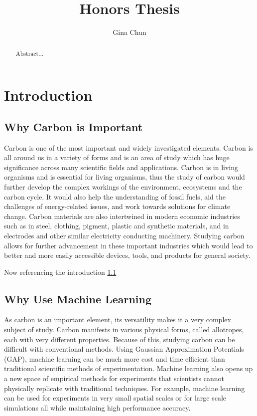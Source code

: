 \documentclass[12pt]{scrartcl}
\title{Honors Thesis}
\author{Gina Chun}
\begin{document}
\maketitle

\newpage

\begin{abstract}
  Abstract...
\end{abstract}

\newpage

\tableofcontents

\newpage

\section{Introduction}\label{Introduction}



\subsection{Why Carbon is Important}\label{Test}


Carbon is one of the most important and widely investigated
elements. Carbon is all around us in a variety of forms and is an area
of study which has huge significance across many scientific fields and
applications. Carbon is in living organisms and is essential for
living organisms, thus the study of carbon would further develop the
complex workings of the environment, ecosystems and the carbon
cycle. It would also help the understanding of fossil fuels, aid the
challenges of energy-related issues, and work towards solutions for
climate change. Carbon materials are also intertwined in modern
economic industries such as in steel, clothing, pigment, plastic and
synthetic materials, and in electrodes and other similar electricity
conducting machinery. Studying carbon allows for further advancement
in these important industries which would lead to better and more
easily accessible devices, tools, and products for general society.

Now referencing the introduction \ref{Test}

\subsection{Why Use Machine Learning}
As carbon is an important element, its versatility makes it a very
complex subject of study. Carbon manifests in various physical forms,
called allotropes, each with very different properties. Because of
this, studying carbon can be difficult with conventional
methods. Using Gaussian Approximation Potentials (GAP), machine
learning can be much more cost and time efficient than traditional
scientific methods of experimentation. Machine learning also opens up
a new space of empirical methods for experiments that scientists
cannot physically replicate with traditional techniques. For example,
machine learning can be used for experiments in very small spatial
scales or for large scale simulations all while maintaining high
performance accuracy.
\end{document}
